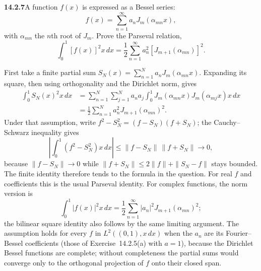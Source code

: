 \par\bigskip
\noindent\textbf{14.2.7}\quad A function $f(x)$ is expressed as a
Bessel series:
\[
f(x)=\sum_{n=1}^{\infty}a_{n}J_{m}(\alpha_{mn}x),
\]
with $\alpha_{mn}$ the $n$th root of $J_{m}$. Prove the Parseval
relation,
\[
\int_{0}^{1}[f(x)]^{2}x\,dx
=\frac{1}{2}\sum_{n=1}^{\infty}a_{n}^{2}[J_{m+1}(\alpha_{mn})]^{2}.
\]
\par{}
\solution
First take a finite partial sum
$S_N(x)=\sum_{n=1}^N a_nJ_m(\alpha_{mn}x)$. Expanding its square,
then using orthogonality and the Dirichlet norm, gives
\begin{align*}
\int_0^1 S_N(x)^2x\,dx
&=\sum_{n=1}^N\sum_{j=1}^N a_na_j
\int_0^1J_m(\alpha_{mn}x)J_m(\alpha_{mj}x)x\,dx\\
&=\frac12\sum_{n=1}^N a_n^2J_{m+1}(\alpha_{mn})^2.
\end{align*}
Under that assumption, write $f^2-S_N^2=(f-S_N)(f+S_N)$; the
Cauchy--Schwarz inequality gives
\[
\left|\int_0^1(f^2-S_N^2)x\,dx\right|
\le\|f-S_N\|\,\|f+S_N\|\longrightarrow0,
\]
because $\|f-S_N\|\to0$ while $\|f+S_N\|\le2\|f\|+\|S_N-f\|$ stays
bounded.
The finite identity therefore tends to the formula in the question.
For real $f$ and coefficients this is the usual Parseval identity.
For complex functions, the norm version is
\[
\int_0^1|f(x)|^2x\,dx
=\frac12\sum_{n=1}^{\infty}|a_n|^2J_{m+1}(\alpha_{mn})^2;
\]
the bilinear square identity also follows by the same limiting
argument. The assumption holds for every $f$ in $L^2((0,1),x\,dx)$
when the $a_n$ are its Fourier--Bessel coefficients (those of
Exercise~14.2.5(a) with $a=1$), because the Dirichlet Bessel
functions are complete; without completeness the partial sums would
converge only to the orthogonal projection of $f$ onto their closed
span.

